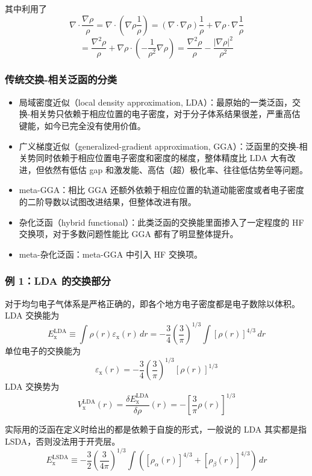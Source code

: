 其中利用了
\begingroup
\small
\[
\nabla\cdot\frac{\nabla\rho}{\rho}
=
\nabla\cdot\left(\nabla\rho\frac{1}{\rho}\right)
=
(\nabla\cdot\nabla\rho)\frac{1}{\rho}
+
\nabla\rho\cdot\nabla\frac{1}{\rho}
\]
\[
=
\frac{\nabla^2\rho}{\rho}
+
\nabla\rho\cdot\left(-\frac{1}{\rho^2}\nabla\rho\right)
=
\frac{\nabla^2\rho}{\rho}
-\frac{|\nabla\rho|^2}{\rho^2}
\]
\endgroup

\subsubsection*{传统交换-相关泛函的分类}

\begin{itemize}
  \item 局域密度近似（local density approximation, LDA）：最原始的一类泛函，交换-相关势只依赖于相应位置的电子密度，对于分子体系结果很差，严重高估键能，如今已完全没有使用价值。
  \item 广义梯度近似（generalized-gradient approximation, GGA）：泛函里的交换-相关势同时依赖于相应位置电子密度和密度的梯度，整体精度比 LDA 大有改进，但依然有低估 gap 和激发能、高估（超）极化率、往往低估势垒等问题。
  \item meta-GGA：相比 GGA 还额外依赖于相应位置的轨道动能密度或者电子密度的二阶导数以试图改进结果，但整体改进有限。
  \item 杂化泛函（hybrid functional）：此类泛函的交换能里面掺入了一定程度的 HF 交换项，对于多数问题性能比 GGA 都有了明显整体提升。
  \item meta-杂化泛函：meta-GGA 中引入 HF 交换项。
\end{itemize}

\subsubsection*{例 1：LDA 的交换部分}

对于均匀电子气体系是严格正确的，即各个地方电子密度都是电子数除以体积。LDA 交换能为
\[
E_{\mathrm{x}}^{\mathrm{LDA}}
\equiv
\int \rho(r)\varepsilon_{\mathrm{x}}(r)\,dr
=
-\frac{3}{4}\left(\frac{3}{\pi}\right)^{1/3}
\int [\rho(r)]^{4/3}\,dr
\]
单位电子的交换能为
\[
\varepsilon_{\mathrm{x}}(r)
=
-\frac{3}{4}\left(\frac{3}{\pi}\right)^{1/3}
[\rho(r)]^{1/3}
\]
LDA 交换势为
\[
V_{\mathrm{x}}^{\mathrm{LDA}}(r)
=
\frac{\delta E_{\mathrm{x}}^{\mathrm{LDA}}}{\delta \rho}(r)
=
-\left[\frac{3}{\pi}\rho(r)\right]^{1/3}
\]

实际用的泛函在定义时给出的都是依赖于自旋的形式，一般说的 LDA 其实都是指 LSDA，否则没法用于开壳层。
\[
E_{\mathrm{x}}^{\mathrm{LSDA}}
\equiv
-\frac{3}{2}\left(\frac{3}{4\pi}\right)^{1/3}
\int \left([\rho_\alpha(r)]^{4/3}+[\rho_\beta(r)]^{4/3}\right)\,dr
\]

